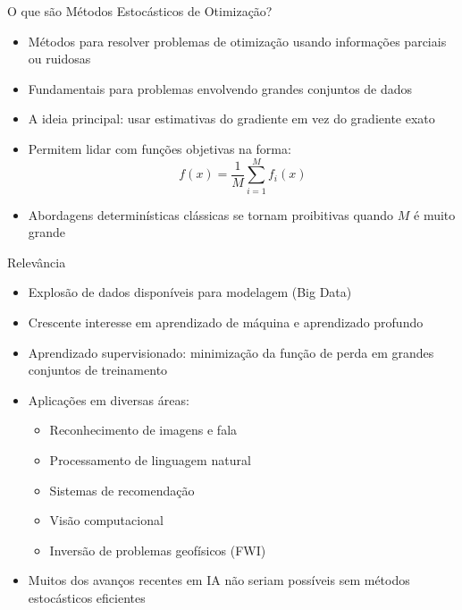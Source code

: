 \documentclass[aspectratio=1610]{beamer}
\begin{document}
\begin{frame}{O que são Métodos Estocásticos de Otimização?}
\begin{itemize}
    \item Métodos para resolver problemas de otimização usando informações parciais ou ruidosas \pause
    \item Fundamentais para problemas envolvendo grandes conjuntos de dados \pause
    \item A ideia principal: usar estimativas do gradiente em vez do gradiente exato \pause
    \item Permitem lidar com funções objetivas na forma:
    \begin{equation*}
        f(x) = \frac{1}{M} \sum_{i=1}^{M} f_i(x)
    \end{equation*} \pause
    \item Abordagens determinísticas clássicas se tornam proibitivas quando $M$ é muito grande
\end{itemize}
\end{frame}



\begin{frame}{Relevância}
\begin{itemize}
    \item Explosão de dados disponíveis para modelagem (Big Data) \pause
    \item Crescente interesse em aprendizado de máquina e aprendizado profundo \pause
    \item Aprendizado supervisionado: minimização da função de perda em grandes conjuntos de treinamento \pause
    \item Aplicações em diversas áreas: \pause
    \begin{itemize}
        \item Reconhecimento de imagens e fala \pause
        \item Processamento de linguagem natural \pause
        \item Sistemas de recomendação \pause
        \item Visão computacional \pause
        \item Inversão de problemas geofísicos (FWI)
    \end{itemize} \pause
    \item Muitos dos avanços recentes em IA não seriam possíveis sem métodos estocásticos eficientes
\end{itemize}
\end{frame}
\end{document}
